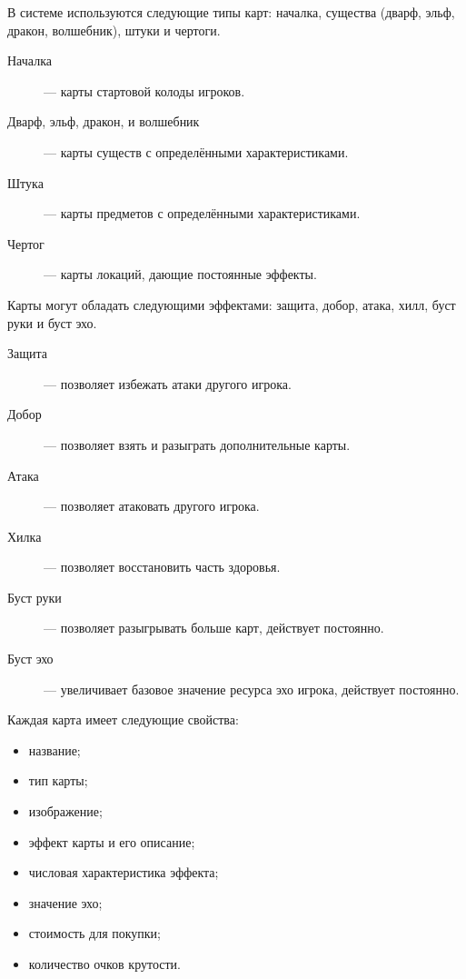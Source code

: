 В системе используются следующие типы карт: началка, существа (дварф, эльф,
дракон, волшебник), штуки и чертоги.
\begin{description}
	\item[Началка] --- карты стартовой колоды игроков.

	\item[Дварф, эльф, дракон, и волшебник] --- карты существ с
		определёнными характеристиками.

	\item[Штука] --- карты предметов с определёнными характеристиками.

	\item[Чертог] --- карты локаций, дающие постоянные эффекты.
\end{description}

Карты могут обладать следующими эффектами: защита, добор, атака, хилл, буст
руки и буст эхо.

\begin{description}
	\item[Защита] --- позволяет избежать атаки другого игрока.

	\item[Добор] --- позволяет взять и разыграть дополнительные карты.

	\item[Атака] --- позволяет атаковать другого игрока.

	\item[Хилка] --- позволяет восстановить часть здоровья.

	\item[Буст руки] --- позволяет разыгрывать больше карт, действует
		постоянно.

	\item[Буст эхо] --- увеличивает базовое значение ресурса эхо игрока,
		действует постоянно.
\end{description}

Каждая карта имеет следующие свойства:
\begin{itemize}
	\item название;
	\item тип карты;
	\item изображение;
	\item эффект карты и его описание;
	\item числовая характеристика эффекта;
	\item значение эхо;
	\item стоимость для покупки;
	\item количество очков крутости.
\end{itemize}

